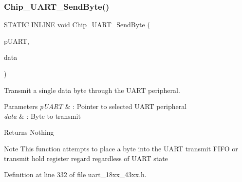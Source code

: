 \mbox{\label{group___u_a_r_t__18_x_x__43_x_x_gaa600b8621d1425b1b493238a68f38088}} 
\subsubsection{\texorpdfstring{Chip\+\_\+\+U\+A\+R\+T\+\_\+\+Send\+Byte()}{Chip\_UART\_SendByte()}}
{\footnotesize\ttfamily \hyperlink{group___l_p_c___types___public___macros_ga10b2d890d871e1489bb02b7e70d9bdfb}{S\+T\+A\+T\+IC} \hyperlink{spifi__18xx__43xx_8h_a2eb6f9e0395b47b8d5e3eeae4fe0c116}{I\+N\+L\+I\+NE} void Chip\+\_\+\+U\+A\+R\+T\+\_\+\+Send\+Byte (\begin{DoxyParamCaption}\item[{\hyperlink{struct_l_p_c___u_s_a_r_t___t}{L\+P\+C\+\_\+\+U\+S\+A\+R\+T\+\_\+T} $\ast$}]{p\+U\+A\+RT,  }\item[{uint8\+\_\+t}]{data }\end{DoxyParamCaption})}



Transmit a single data byte through the U\+A\+RT peripheral. 


\begin{DoxyParams}{Parameters}
{\em p\+U\+A\+RT} & \+: Pointer to selected U\+A\+RT peripheral \\
\hline
{\em data} & \+: Byte to transmit \\
\hline
\end{DoxyParams}
\begin{DoxyReturn}{Returns}
Nothing 
\end{DoxyReturn}
\begin{DoxyNote}{Note}
This function attempts to place a byte into the U\+A\+RT transmit F\+I\+FO or transmit hold register regard regardless of U\+A\+RT state 
\end{DoxyNote}


Definition at line 332 of file uart\+\_\+18xx\+\_\+43xx.\+h.

\mbox{\label{group___u_a_r_t__18_x_x__43_x_x_ga6ed43ed19b9d2a32ece3e50bc2f651a9}} 
